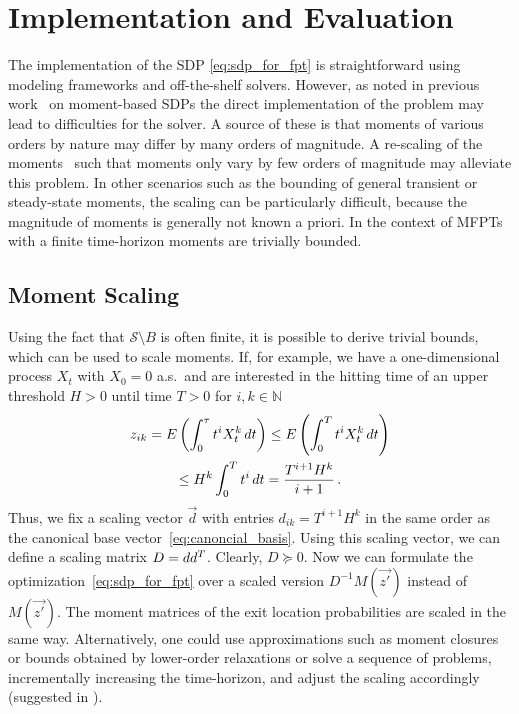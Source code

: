 \section{Implementation and Evaluation}\label{sec:mfpt:evaluation}
The implementation of the \ac{SDP} \eqref{eq:sdp_for_fpt} is straightforward using
modeling frameworks and off-the-shelf solvers.
However, as noted in previous work~\cite{dowdy2018dynamic,sakurai2017convex,dowdy2018bounds,sakurai2019bounding} on moment-based \acp{SDP}
the direct implementation of the problem may lead to difficulties for the solver.
A source of these is that moments of various orders by nature
may differ by many orders of magnitude.
A re-scaling of the moments~\cite{dowdy2018bounds,sakurai2019bounding}
such that moments only vary by few orders of magnitude
may alleviate this problem.
In other scenarios such as the bounding of general transient or steady-state moments,
the scaling can be particularly difficult,
because the magnitude of moments is generally not known
a priori. In the context of \acp{MFPT} with a finite time-horizon
moments are trivially bounded.

\subsection{Moment Scaling}\label{sec:mfpt:scaling}
Using the fact that
$\mathcal{S}\setminus {B}$ is often finite,
it is possible to derive trivial bounds, which can be used to scale moments.
If, for example, we have a one-dimensional process $X_t$ with $X_0 = 0$ a.s.\ and are interested in the hitting
time of an upper threshold $H>0$ until time $T>0$ for $i,k\in \mathbb N$
\begin{multline*}
z_{ik} = {E}\left(\int_0^{\tau}t^i X_t^k\,dt\right)\leq{E}\left(\int_0^T t^i X_t^k\,dt\right)\\\leq H^k\int_0^T t^i\,dt
=\frac{T^{i+1}H^k}{i+1}\,.
\end{multline*}
Thus, we fix a scaling vector $\vec d$ with entries $d_{ik}={T^{i+1}H^k}$ in
the same order
as the canonical base vector~\eqref{eq:canoncial_basis}.
Using this scaling vector, we can define a scaling
matrix $D={d}{d}^{T}$.
Clearly, $D \succeq 0$.
Now we can formulate the optimization~\eqref{eq:sdp_for_fpt}
over a scaled version $D^{-1}M(\vec{z'})$ instead of $M(\vec{z'})$.
The moment matrices of the exit location probabilities are scaled in the same
way.
Alternatively, one could use approximations such as moment closures
or bounds obtained by lower-order relaxations or solve a sequence
of problems, incrementally increasing
the time-horizon, and adjust the scaling accordingly (suggested in \cite{dowdy2018dynamic}).


